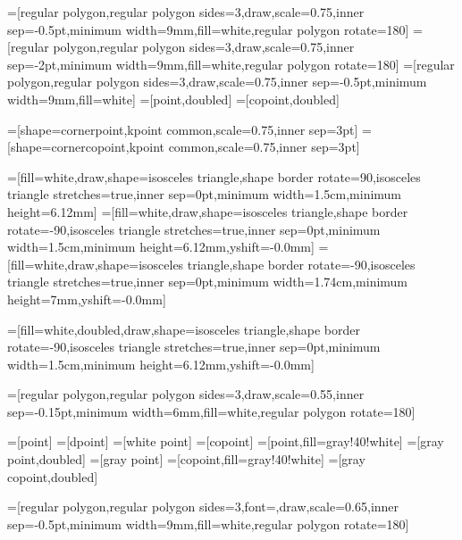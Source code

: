 =[regular polygon,regular polygon sides=3,draw,scale=0.75,inner sep=-0.5pt,minimum width=9mm,fill=white,regular polygon rotate=180]
=[regular polygon,regular polygon sides=3,draw,scale=0.75,inner sep=-2pt,minimum width=9mm,fill=white,regular polygon rotate=180]
=[regular polygon,regular polygon sides=3,draw,scale=0.75,inner sep=-0.5pt,minimum width=9mm,fill=white]
=[point,doubled]
=[copoint,doubled]

=[shape=cornerpoint,kpoint common,scale=0.75,inner sep=3pt]
=[shape=cornercopoint,kpoint common,scale=0.75,inner sep=3pt]

=[fill=white,draw,shape=isosceles triangle,shape border rotate=90,isosceles triangle stretches=true,inner sep=0pt,minimum width=1.5cm,minimum height=6.12mm]
=[fill=white,draw,shape=isosceles triangle,shape border rotate=-90,isosceles triangle stretches=true,inner sep=0pt,minimum width=1.5cm,minimum height=6.12mm,yshift=-0.0mm]
=[fill=white,draw,shape=isosceles triangle,shape border rotate=-90,isosceles triangle stretches=true,inner sep=0pt,minimum width=1.74cm,minimum height=7mm,yshift=-0.0mm]

=[fill=white,doubled,draw,shape=isosceles triangle,shape border rotate=-90,isosceles triangle stretches=true,inner sep=0pt,minimum width=1.5cm,minimum height=6.12mm,yshift=-0.0mm]

=[regular polygon,regular polygon sides=3,draw,scale=0.55,inner sep=-0.15pt,minimum width=6mm,fill=white,regular polygon rotate=180] 

=[point]
=[dpoint]
=[white point] %
=[copoint]
=[point,fill=gray!40!white]
=[gray point,doubled]
=[gray point] %
=[copoint,fill=gray!40!white]
=[gray copoint,doubled]

=[regular polygon,regular polygon sides=3,font=\scriptsize,draw,scale=0.65,inner sep=-0.5pt,minimum width=9mm,fill=white,regular polygon rotate=180]

